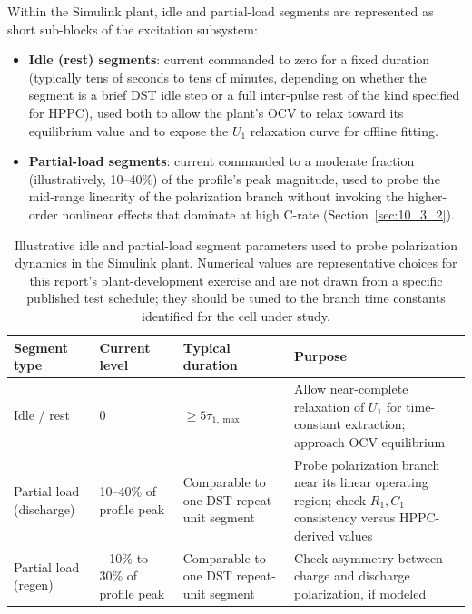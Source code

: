 Within the Simulink plant, idle and partial-load segments are
represented as short sub-blocks of the excitation subsystem:

\begin{itemize}
    \item \textbf{Idle (rest) segments}: current commanded to zero for
    a fixed duration (typically tens of seconds to tens of minutes,
    depending on whether the segment is a brief DST idle step or a
    full inter-pulse rest of the kind specified for HPPC), used both
    to allow the plant's OCV to relax toward its equilibrium value and
    to expose the $U_1$ relaxation curve for offline fitting.
    \item \textbf{Partial-load segments}: current commanded to a
    moderate fraction (illustratively, 10--40\%) of the profile's peak
    magnitude, used to probe the mid-range linearity of the
    polarization branch without invoking the higher-order nonlinear
    effects that dominate at high C-rate (Section~\ref{sec:10_3_2}).
\end{itemize}

\begin{table}[htbp]
\centering
\caption{Illustrative idle and partial-load segment parameters used to probe polarization dynamics in the Simulink plant. Numerical values are representative choices for this report's plant-development exercise and are not drawn from a specific published test schedule; they should be tuned to the branch time constants identified for the cell under study.}
\label{tab:10_idle_partial}
\begin{tabular}{p{2.6cm}p{2.6cm}p{2.6cm}p{4.4cm}}
\toprule
\textbf{Segment type} & \textbf{Current level} & \textbf{Typical duration} & \textbf{Purpose} \\
\midrule
Idle / rest & 0 & $\ge 5\tau_{1,\max}$ & Allow near-complete relaxation of $U_1$ for time-constant extraction; approach OCV equilibrium \\
Partial load (discharge) & 10--40\% of profile peak & Comparable to one DST repeat-unit segment & Probe polarization branch near its linear operating region; check $R_1, C_1$ consistency versus HPPC-derived values \\
Partial load (regen) & $-$10\% to $-$30\% of profile peak & Comparable to one DST repeat-unit segment & Check asymmetry between charge and discharge polarization, if modeled \\
\bottomrule
\end{tabular}
\end{table}

